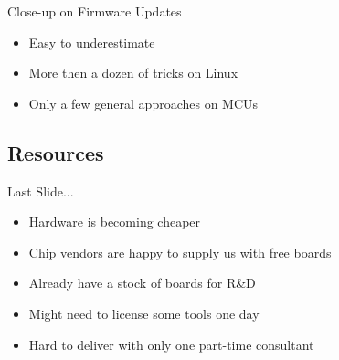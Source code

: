 \documentclass{beamer}
\begin{document}
\begin{frame}{Close-up on Firmware Updates}
\begin{itemize}
  \item Easy to underestimate
  \item More then a dozen of tricks on Linux
  \item Only a few general approaches on MCUs
\end{itemize}
\end{frame}

\subsection{Resources}

\begin{frame}{Last Slide...}
\begin{itemize}
  \item Hardware is becoming cheaper
  \item Chip vendors are happy to supply us with free boards
  \item Already have a stock of boards for R\&D
  \item Might need to license some tools one day
  \item Hard to deliver with only one part-time consultant
\end{itemize}
\end{frame}
\end{document}
